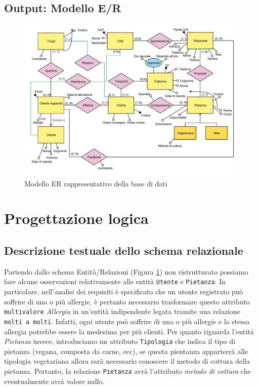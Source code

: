 \documentclass[10pt]{article}
\begin{document}
		\subsection{Output: Modello E/R}
		\begin{figure}[H]
			\begin{center}
				\hspace*{-1cm}%
				\includegraphics[scale=0.54]{er.pdf}%
				\hspace*{-1cm}%
			\end{center}			
			\caption{Modello ER rappresentativo della base di dati \label{fig:ER1}}
		\end{figure}
	\section{Progettazione logica}
		\subsection{Descrizione testuale dello schema relazionale}
Partendo dallo schema Entit\`a/Relazioni (Figura \ref{fig:ER1}) non ristrutturato possiamo fare alcune osservazioni relativamente alle entit\`a \texttt{Utente} e \texttt{Pietanza}. In particolare, nell'analisi dei requisiti \`e specificato che un utente registrato pu\`o soffrire di una o pi\`u allergie, \`e pertanto necessario trasformare questo attributo \texttt{multivalore} \textit{Allergia} in un'entit\`a indipendente legata tramite una relazione \texttt{molti a molti}. Infatti, ogni utente pu\`o soffrire di una o pi\`u allergie e la stessa allergia potrebbe essere la medesima per pi\`u clienti. Per quanto riguarda l'entit\`a \textit{Pietanza} invece, introduciamo un attributo \texttt{Tipologia} che indica il tipo di pietanza (vegana, composta da carne, ecc), se questa pientanza apparterr\`a alle tipologia vegetariana allora sar\`a necessario conoscere il metodo di cottura della pietanza. Pertanto, la relazione \texttt{Pietanza} avr\`a l'attributo \textit{metodo di cottura} che eventualmente avr\`a valore nullo.  
\end{document}
